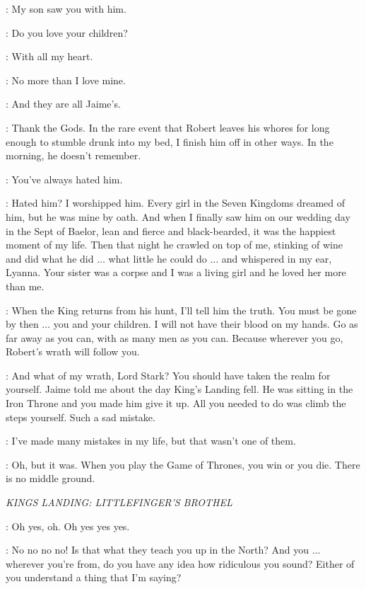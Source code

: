 \NED: My son saw you with him. 

\CERSEI: Do you love your children? 

\NED: With all my heart. 

\CERSEI: No more than I love mine. 

\NED: And they are all Jaime's. 

\CERSEI: Thank the Gods. In the rare event that Robert leaves his whores for long enough to stumble drunk into my bed, I finish him off in other ways. In the morning, he doesn't remember. 

\NED: You've always hated him. 

\CERSEI: Hated him? I worshipped him. Every girl in the Seven Kingdoms dreamed of him, but he was mine by oath. And when I finally saw him on our wedding day in the Sept of Baelor, lean and fierce and black-bearded, it was the happiest moment of my life. Then that night he crawled on top of me, stinking of wine and did what he did $\ldots$ what little he could do $\ldots$ and whispered in my ear, Lyanna. Your sister was a corpse and I was a living girl and he loved her more than me. 

\NED: When the King returns from his hunt, I'll tell him the truth. You must be gone by then $\ldots$ you and your children. I will not have their blood on my hands. Go as far away as you can, with as many men as you can. Because wherever you go, Robert's wrath will follow you. 

\CERSEI: And what of my wrath, Lord Stark? You should have taken the realm for yourself. Jaime told me about the day King's Landing fell. He was sitting in the Iron Throne and you made him give it up. All you needed to do was climb the steps yourself. Such a sad mistake. 

\NED: I've made many mistakes in my life, but that wasn't one of them. 

\CERSEI: Oh, but it was. When you play the Game of Thrones, you win or you die. There is no middle ground. 


\scene

\textit{KINGS LANDING: LITTLEFINGER'S BROTHEL} 


\ROS: Oh yes, oh. Oh yes yes yes. 

\LITTLEFINGER: No no no no! Is that what they teach you up in the North? And you $\ldots$ wherever you're from, do you have any idea how ridiculous you sound? Either of you understand a thing that I'm saying? 

